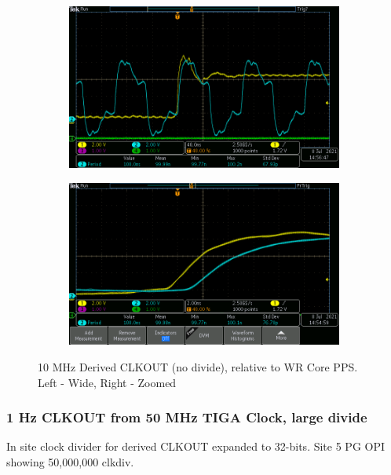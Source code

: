 \documentclass[]{article}
\begin{document}
\begin{figure}[H]
    \begin{subfigure}{0.5\textwidth}
        \includegraphics[width=0.9\linewidth]{images/WR_PPS_vs_10M_CLK_OUT_LEMO_PGSITE_WIDE}
    \end{subfigure}
    \begin{subfigure}{0.5\textwidth}
        \includegraphics[width=0.9\linewidth]{images/WR_PPS_vs_10M_CLK_OUT_LEMO_PGSITE}
    \end{subfigure}

    \caption{10 MHz Derived CLKOUT (no divide), relative to WR Core PPS. Left - Wide, Right - Zoomed}
    \label{10M_clkout}
\end{figure}

\subsubsection{1 Hz CLKOUT from 50 MHz TIGA Clock, large divide}
In site clock divider for derived CLKOUT expanded to 32-bits. Site 5 PG OPI showing 50,000,000 clkdiv.
\end{document}
